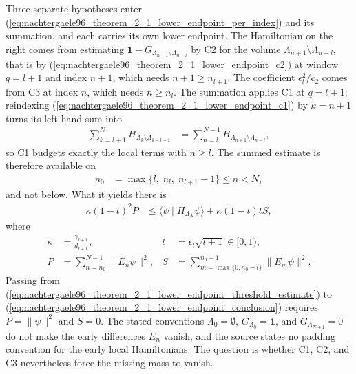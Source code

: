 \documentclass{article}
\begin{document}
Three separate hypotheses enter
(\ref{eq:nachtergaele96_theorem_2_1_lower_endpoint_per_index}) and its
summation, and each carries its own lower endpoint. The Hamiltonian on the
right comes from estimating $\mathbf 1-G_{\Lambda_{n+1}\setminus\Lambda_{n-l}}$
by C2 for the volume $\Lambda_{n+1}\setminus\Lambda_{n-l}$, that is by
(\ref{eq:nachtergaele96_theorem_2_1_lower_endpoint_c2}) at window $q=l+1$ and
index $n+1$, which needs $n+1\geq n_{l+1}$. The coefficient
$\epsilon_l^2/c_2$ comes from C3 at index $n$, which needs $n\geq n_l$. The
summation applies C1 at $q=l+1$; reindexing
(\ref{eq:nachtergaele96_theorem_2_1_lower_endpoint_c1}) by $k=n+1$ turns its
left-hand sum into
\begin{align}
    \sum_{k=l+1}^{N}H_{\Lambda_k\setminus\Lambda_{k-l-1}}
        &=\sum_{n=l}^{N-1}H_{\Lambda_{n+1}\setminus\Lambda_{n-l}},
    \label{eq:nachtergaele96_theorem_2_1_lower_endpoint_c1_reindex}
\end{align}
so C1 budgets exactly the local terms with $n\geq l$. The summed estimate is
therefore available on
\begin{align}
    n_0
        &=\max\{l,\;n_l,\;n_{l+1}-1\}
        \leq n<N,
    \label{eq:nachtergaele96_theorem_2_1_lower_endpoint_threshold}
\end{align}
and not below. What it yields there is
\begin{align}
    \kappa\left(1-t\right)^2P
        &\leq\langle\psi\mid H_{\Lambda_N}\psi\rangle
              +\kappa\left(1-t\right)tS,
    \label{eq:nachtergaele96_theorem_2_1_lower_endpoint_threshold_estimate}
\end{align}
where
\begin{align}
    \kappa
        &=\frac{\gamma_{l+1}}{d_{l+1}},
    &
    t
        &=\epsilon_l\sqrt{l+1}\in[0,1),
    \label{eq:nachtergaele96_theorem_2_1_lower_endpoint_constants}\\
    P
        &=\sum_{n=n_0}^{N-1}\lVert E_n\psi\rVert^2,
    &
    S
        &=\sum_{m=\max\{0,n_0-l\}}^{n_0-1}\lVert E_m\psi\rVert^2.
    \label{eq:nachtergaele96_theorem_2_1_lower_endpoint_masses}
\end{align}
Passing from
(\ref{eq:nachtergaele96_theorem_2_1_lower_endpoint_threshold_estimate}) to
(\ref{eq:nachtergaele96_theorem_2_1_lower_endpoint_conclusion}) requires
$P=\lVert\psi\rVert^2$ and $S=0$. The stated conventions
$\Lambda_0=\emptyset$, $G_{\Lambda_0}=\mathbf 1$, and
$G_{\Lambda_{N+1}}=0$ do not make the early differences $E_n$ vanish, and the
source states no padding convention for the early local Hamiltonians. The
question is whether C1, C2, and C3 nevertheless force the missing mass to
vanish.
\end{document}
